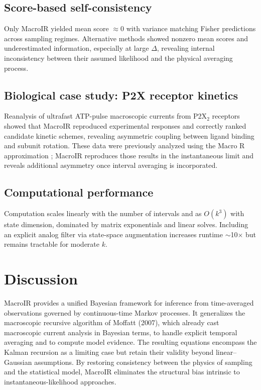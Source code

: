 \documentclass[9pt]{elife}
\begin{document}
	\subsection*{Score-based self-consistency}
	Only MacroIR yielded mean score $\approx0$ with variance matching Fisher predictions across sampling regimes. 
	Alternative methods showed nonzero mean scores and underestimated information, especially at large $\Delta$, revealing internal inconsistency between their assumed likelihood and the physical averaging process.
	
	\subsection*{Biological case study: P2X receptor kinetics}
	Reanalysis of ultrafast ATP-pulse macroscopic currents from P2X$_2$ receptors showed that MacroIR reproduced experimental responses and correctly ranked candidate kinetic schemes, revealing asymmetric coupling between ligand binding and subunit rotation. 
	These data were previously analyzed using the Macro R approximation \citep{Moffatt2007}; MacroIR reproduces those results in the instantaneous limit and reveals additional asymmetry once interval averaging is incorporated.
	
	\subsection*{Computational performance}
	Computation scales linearly with the number of intervals and as $O(k^3)$ with state dimension, dominated by matrix exponentials and linear solves. 
	Including an explicit analog filter via state-space augmentation increases runtime $\sim$10$\times$ but remains tractable for moderate $k$.
	
	\section*{Discussion}
	
	MacroIR provides a unified Bayesian framework for inference from time-averaged observations governed by continuous-time Markov processes. 
	It generalizes the macroscopic recursive algorithm of Moffatt (2007), which already cast macroscopic current analysis in Bayesian terms, to handle explicit temporal averaging and to compute model evidence. 
	The resulting equations encompass the Kalman recursion as a limiting case but retain their validity beyond linear–Gaussian assumptions.  
	By restoring consistency between the physics of sampling and the statistical model, MacroIR eliminates the structural bias intrinsic to instantaneous-likelihood approaches.
	
\end{document}
